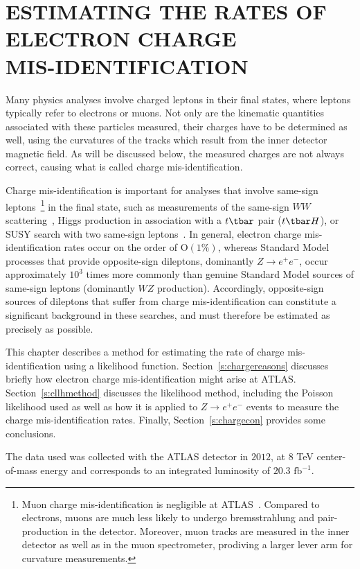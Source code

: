 
\chapter{ESTIMATING THE RATES OF ELECTRON CHARGE
  \\MIS-IDENTIFICATION}\label{c:cid}

Many physics analyses involve charged leptons in their final states, where
leptons typically refer to electrons or muons. Not only are the kinematic
quantities associated with these particles measured, their charges have to be
determined as well, using the curvatures of the tracks which result from the
inner detector magnetic field. As will be discussed below, the measured charges
are not always correct, causing what is called charge mis-identification.

Charge mis-identification is important for analyses that involve same-sign
leptons~\footnote{Muon charge mis-identification is negligible at
	ATLAS~\cite{muonchargemid}. Compared to electrons, muons are much less likely
	to undergo bremsstrahlung and pair-production in the detector. Moreover, muon
	tracks are measured in the inner detector as well as in the muon spectrometer,
	prodiving a larger lever arm for curvature measurements.} in the final state,
such as measurements of the same-sign $WW$ scattering~\cite{sswwscatting},
Higgs production in association with a $t\tbar$ pair ($t\tbar H$), or SUSY
search with two same-sign leptons~\cite{ssssleptons}. In general, electron
charge mis-identification rates occur on the order of $\text{O}(1\%)$, whereas
Standard Model processes that provide opposite-sign dileptons, dominantly $Z\to
	e^+e^-$, occur approximately $10^3$ times more commonly than genuine Standard
Model sources of same-sign leptons (dominantly $WZ$ production). Accordingly,
opposite-sign sources of dileptons that suffer from charge mis-identification
can constitute a significant background in these searches, and must therefore
be estimated as precisely as possible.


This chapter describes a method for estimating the rate of charge
mis-identification using a likelihood function. Section~\ref{s:chargereasons}
discusses briefly how electron charge mis-identification might arise at ATLAS.
Section~\ref{s:cllhmethod} discusses the likelihood method, including the
Poisson likelihood used as well as how it is applied to $Z\to e^+e^-$ events to
measure the charge mis-identification rates. Finally, Section~\ref{s:chargecon}
provides some conclusions.

The data used was collected with the ATLAS detector in $2012$, at $8$ TeV
center-of-mass energy and corresponds to an integrated luminosity of $20.3$
$\text{fb}^{-1}$.


